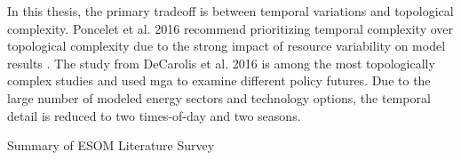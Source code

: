 In this thesis, the primary tradeoff is between temporal variations and topological
complexity. Poncelet et al. 2016 recommend prioritizing temporal complexity over
topological complexity due to the strong impact of resource variability on model
results \cite{poncelet_impact_2016}. The study from DeCarolis et al. 2016 is
among the most topologically complex studies and used \gls{mga} to examine
different policy futures. Due to the large number of modeled energy sectors and
technology options, the temporal detail is reduced to two times-of-day and two
seasons.

  \begin{table}
    \centering
    \caption{Summary of ESOM Literature Survey}
    \label{tab:esom_lit}
    \resizebox{\textwidth}{!}{}
  \end{table}


